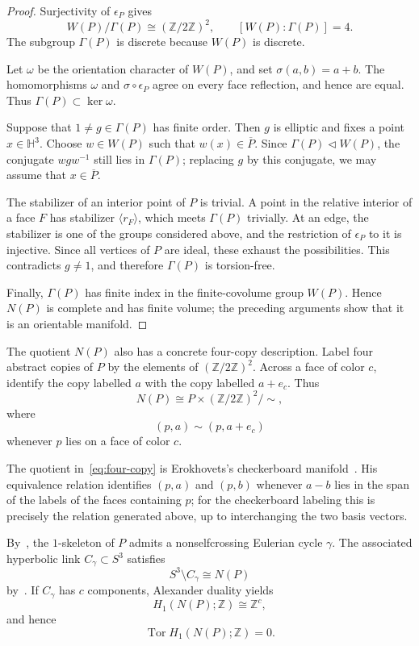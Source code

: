 \documentclass[11pt,a4paper]{amsart}
\newcommand{\HH}{\mathbb H}
\newcommand{\ZZ}{\mathbb Z}
\newcommand{\Tor}{\operatorname{Tor}}
\theoremstyle{plain}
\theoremstyle{remark}
\begin{document}
\begin{proof}
Surjectivity of $\epsilon_P$ gives
\[
  W(P)/\Gamma(P)\cong(\ZZ/2\ZZ)^2,
  \qquad
  [W(P):\Gamma(P)]=4.
\]
The subgroup $\Gamma(P)$ is discrete because $W(P)$ is discrete.

Let $\omega$ be the orientation character of $W(P)$, and set
$\sigma(a,b)=a+b$.  The homomorphisms $\omega$ and
$\sigma\circ\epsilon_P$ agree on every face reflection, and hence
are equal.  Thus $\Gamma(P)\subset\ker\omega$.

Suppose that $1\neq g\in\Gamma(P)$ has finite order.  Then $g$ is
elliptic and fixes a point $x\in\HH^3$.  Choose $w\in W(P)$ such that
$w(x)\in\overline P$.  Since $\Gamma(P)\triangleleft W(P)$, the
conjugate $wgw^{-1}$ still lies in $\Gamma(P)$; replacing $g$ by this
conjugate, we may assume that $x\in\overline P$.

The stabilizer of an interior point of $P$ is trivial.  A point in
the relative interior of a face $F$ has stabilizer $\langle r_F\rangle$,
which meets $\Gamma(P)$ trivially.  At an edge, the stabilizer is one
of the groups considered above, and the restriction of $\epsilon_P$
to it is injective.  Since all vertices of $P$ are ideal, these exhaust
the possibilities.  This contradicts $g\neq1$, and therefore
$\Gamma(P)$ is torsion-free.

Finally, $\Gamma(P)$ has finite index in the finite-covolume group
$W(P)$.  Hence $N(P)$ is complete and has finite volume; the preceding
arguments show that it is an orientable manifold.
\end{proof}

The quotient $N(P)$ also has a concrete four-copy description.  Label
four abstract copies of $P$ by the elements of $(\ZZ/2\ZZ)^2$.  Across
a face of color $c$, identify the copy labelled $a$ with the copy
labelled $a+e_c$.  Thus
\begin{equation}\label{eq:four-copy}
  N(P)\cong P\times(\ZZ/2\ZZ)^2/\!\sim,
\end{equation}
where
\[
  (p,a)\sim(p,a+e_c)
\]
whenever $p$ lies on a face of color $c$.

The quotient in~\eqref{eq:four-copy} is Erokhovets's checkerboard
manifold~\cite[Construction~5.4]{Erokhovets}.  His equivalence relation
identifies $(p,a)$ and $(p,b)$ whenever $a-b$ lies in the span of the
labels of the faces containing $p$; for the checkerboard labeling this
is precisely the relation generated above, up to interchanging the two
basis vectors.

By~\cite[Proposition~5.1]{Erokhovets}, the $1$-skeleton of $P$ admits a
nonselfcrossing Eulerian cycle $\gamma$.  The associated hyperbolic link
$C_\gamma\subset S^3$ satisfies
\begin{equation}\label{eq:Erokhovets-homeomorphism}
  S^3\setminus C_\gamma\cong N(P)
\end{equation}
by~\cite[Proposition~5.5]{Erokhovets}.  If $C_\gamma$ has $c$ components,
Alexander duality yields
\[
  H_1(N(P);\ZZ)\cong\ZZ^c,
\]
and hence
\begin{equation}\label{eq:H1-torsion-free}
  \Tor H_1(N(P);\ZZ)=0.
\end{equation}
\end{document}
